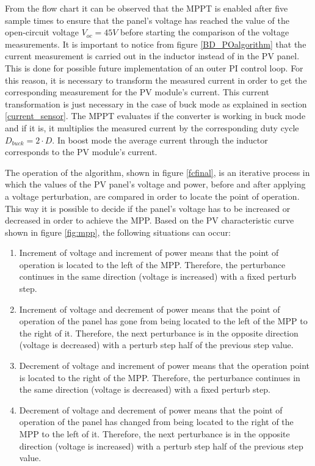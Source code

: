 From the flow chart it can be observed that the MPPT is enabled after five sample times to ensure that the panel's voltage has reached the value of the open-circuit voltage $V_{oc}=45 V$ before starting the comparison of the voltage measurements.
It is important to notice from figure \ref{BD_POalgorithm} that the current measurement is carried out in the inductor instead of in the PV panel. This is done for possible future implementation of an outer PI control loop. For this reason, it is necessary to transform the measured current in order to get the corresponding measurement for the PV module's current. This current transformation is just necessary in the case of buck mode as explained in section \ref{current_sensor}. The MPPT evaluates if the converter is working in buck mode and if it is, it multiplies the measured current by the corresponding duty cycle $D_{buck}=2\cdot D$. In boost mode the average current through the inductor corresponds to the PV module's current. 


The operation of the algorithm, shown in figure \ref{fcfinal}, is an iterative process in which the values of the PV panel's voltage and power, before and after applying a voltage perturbation, are compared  in order to locate the point of operation. This way it is possible to decide if the panel's voltage has to be increased or decreased in order to achieve the MPP. Based on the PV characteristic curve shown in figure \ref{fig:mpp}, the following situations can occur:

\begin{enumerate}
\item Increment of voltage and increment of power means that the point of operation is located to the left of the MPP. Therefore, the perturbance continues in the same direction (voltage is increased) with a fixed perturb step. 
\item Increment of voltage and decrement of power means that the point of operation of the panel has gone from being located to the left of the MPP to the right of it. Therefore, the next perturbance is in the opposite direction (voltage is decreased) with a perturb step half of the previous step value.
\item Decrement of voltage and increment of power means that the operation point is located to the right of the MPP. Therefore, the perturbance continues in the same direction (voltage is decreased) with a fixed perturb step. 
\item Decrement of voltage and decrement of power means that the point of operation of the panel has changed from being located to the right of the MPP to the left of it. Therefore, the next perturbance is in the opposite direction (voltage is increased) with a perturb step half of the previous step value.
\end{enumerate}

